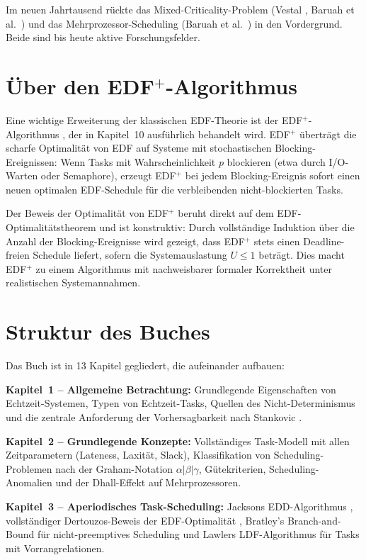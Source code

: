 ﻿\documentclass[a4paper,12pt]{report}
\theoremstyle{definition}
\begin{document}
Im neuen Jahrtausend rückte das Mixed-Criticality-Problem (Vestal \cite{Vestal2007},
Baruah et al.\ \cite{BaruahMCS2012}) und das Mehrprozessor-Scheduling (Baruah
et al.\ \cite{BaruahPfair1996}) in den Vordergrund. Beide sind bis heute
aktive Forschungsfelder.

\section*{Über den EDF$^+$-Algorithmus}

Eine wichtige Erweiterung der klassischen EDF-Theorie ist der EDF$^+$-Algorithmus
\cite{Epp2026}, der in Kapitel~10 ausführlich behandelt wird. EDF$^+$ überträgt
die scharfe Optimalität von EDF auf Systeme mit stochastischen Blocking-Ereignissen:
Wenn Tasks mit Wahrscheinlichkeit $p$ blockieren (etwa durch I/O-Warten oder
Semaphore), erzeugt EDF$^+$ bei jedem Blocking-Ereignis sofort einen neuen
optimalen EDF-Schedule für die verbleibenden nicht-blockierten Tasks.

Der Beweis der Optimalität von EDF$^+$ beruht direkt auf dem EDF-Optimalitätstheorem
und ist konstruktiv: Durch vollständige Induktion über die Anzahl der
Blocking-Ereignisse wird gezeigt, dass EDF$^+$ stets einen Deadline-freien
Schedule liefert, sofern die Systemauslastung $U \leq 1$ beträgt. Dies macht
EDF$^+$ zu einem Algorithmus mit nachweisbarer formaler Korrektheit unter
realistischen Systemannahmen.

\section*{Struktur des Buches}

Das Buch ist in 13 Kapitel gegliedert, die aufeinander aufbauen:

\textbf{Kapitel~1 -- Allgemeine Betrachtung:} Grundlegende Eigenschaften von
Echtzeit-Systemen, Typen von Echtzeit-Tasks, Quellen des Nicht-Determinismus
und die zentrale Anforderung der Vorhersagbarkeit nach Stankovic \cite{Stankovic1988}.

\textbf{Kapitel~2 -- Grundlegende Konzepte:} Vollständiges Task-Modell mit
allen Zeitparametern (Lateness, Laxität, Slack), Klassifikation von Scheduling-Problemen
nach der Graham-Notation $\alpha|\beta|\gamma$, Gütekriterien, Scheduling-Anomalien
und der Dhall-Effekt auf Mehrprozessoren.

\textbf{Kapitel~3 -- Aperiodisches Task-Scheduling:} Jacksons EDD-Algorithmus
\cite{Jackson1955}, vollständiger Dertouzos-Beweis der EDF-Optimalität
\cite{Dertouzos1974}, Bratley's Branch-and-Bound für nicht-preemptives Scheduling
\cite{Bratley1971} und Lawlers LDF-Algorithmus \cite{Lawler1973} für Tasks
mit Vorrangrelationen.
\end{document}
